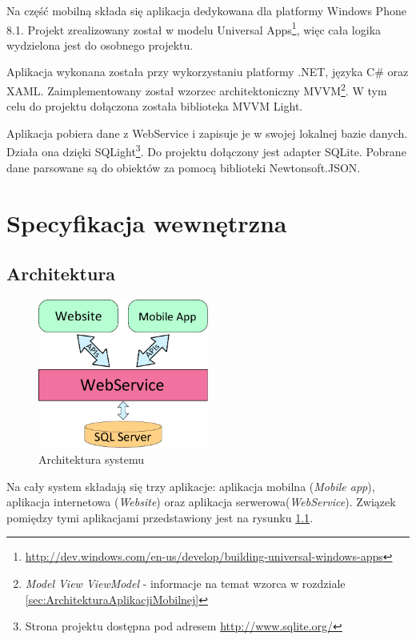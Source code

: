 \documentclass{book}
\begin{document}
		Na część mobilną składa się aplikacja dedykowana dla platformy Windows Phone 8.1. Projekt zrealizowany został w modelu Universal Apps\footnote{\url{http://dev.windows.com/en-us/develop/building-universal-windows-apps}}, więc cała logika wydzielona jest do osobnego projektu.
		
		Aplikacja wykonana została przy wykorzystaniu platformy .NET, języka C\# oraz XAML. Zaimplementowany został wzorzec architektoniczny MVVM\footnote{\emph{Model View ViewModel} - informacje na temat wzorca w rozdziale \ref{sec:ArchitekturaAplikacjiMobilnej}}. W tym celu do projektu dołączona została biblioteka MVVM Light. %
		
		Aplikacja pobiera dane z WebService i zapisuje je w swojej lokalnej bazie danych. Działa ona dzięki SQLight\footnote{Strona projektu dostępna pod adresem \url{http://www.sqlite.org/}}. Do projektu dołączony jest adapter SQLite. Pobrane dane parsowane są do obiektów za pomocą biblioteki Newtonsoft.JSON.

	\chapter{Specyfikacja wewnętrzna}
		\section{Architektura}
		
		\begin{figure}		
			\centering
			\includegraphics[width=0.5\textwidth]{architektura.pdf}
			\caption{Architektura systemu}
			\label{fig:architektura}
		\end{figure}
		
		Na cały system składają się trzy aplikacje: aplikacja mobilna (\emph{Mobile app}), aplikacja internetowa (\emph{Website}) oraz aplikacja serwerowa(\emph{WebService}). Związek pomiędzy tymi aplikacjami przedstawiony jest na rysunku \ref{fig:architektura}. 
			
\end{document}
